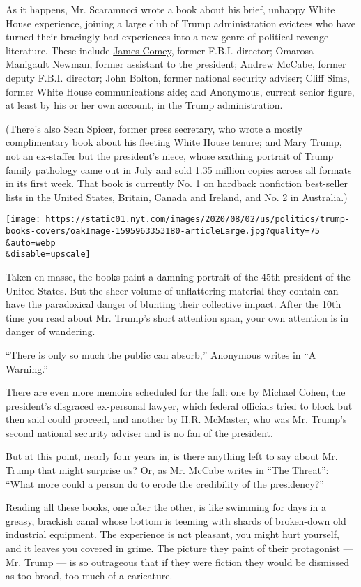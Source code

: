 As it happens, Mr. Scaramucci wrote a book about his brief, unhappy
White House experience, joining a large club of Trump administration
evictees who have turned their bracingly bad experiences into a new
genre of political revenge literature. These include
\href{https://www.nytimes.com/2019/10/12/us/politics/james-comey-trump.html}{James
Comey}, former F.B.I. director; Omarosa Manigault Newman, former
assistant to the president; Andrew McCabe, former deputy F.B.I.
director; John Bolton, former national security adviser; Cliff Sims,
former White House communications aide; and Anonymous, current senior
figure, at least by his or her own account, in the Trump administration.

(There's also Sean Spicer, former press secretary, who wrote a mostly
complimentary book about his fleeting White House tenure; and Mary
Trump, not an ex-staffer but the president's niece, whose scathing
portrait of Trump family pathology came out in July and sold 1.35
million copies across all formats in its first week. That book is
currently No. 1 on hardback nonfiction best-seller lists in the United
States, Britain, Canada and Ireland, and No. 2 in Australia.)

\texttt{[image: https://static01.nyt.com/images/2020/08/02/us/politics/trump-books-covers/oakImage-1595963353180-articleLarge.jpg?quality=75\\\&auto=webp\\\&disable=upscale]}

Taken en masse, the books paint a damning portrait of the 45th president
of the United States. But the sheer volume of unflattering material they
contain can have the paradoxical danger of blunting their collective
impact. After the 10th time you read about Mr. Trump's short attention
span, your own attention is in danger of wandering.

``There is only so much the public can absorb,'' Anonymous writes in ``A
Warning.''

There are even more memoirs scheduled for the fall: one by Michael
Cohen, the president's disgraced ex-personal lawyer, which federal
officials tried to block but then said could proceed, and another by
H.R. McMaster, who was Mr. Trump's second national security adviser and
is no fan of the president.

But at this point, nearly four years in, is there anything left to say
about Mr. Trump that might surprise us? Or, as Mr. McCabe writes in
``The Threat'': ``What more could a person do to erode the credibility
of the presidency?''

Reading all these books, one after the other, is like swimming for days
in a greasy, brackish canal whose bottom is teeming with shards of
broken-down old industrial equipment. The experience is not pleasant,
you might hurt yourself, and it leaves you covered in grime. The picture
they paint of their protagonist --- Mr. Trump --- is so outrageous that
if they were fiction they would be dismissed as too broad, too much of a
caricature.

